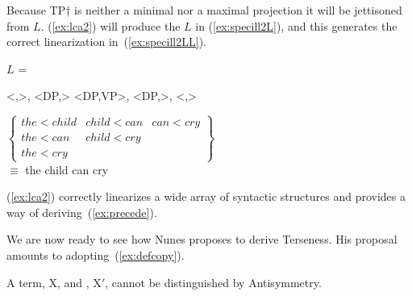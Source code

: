 \documentclass[output=paper]{langsci/langscibook}
\begin{document}
Because TP$\dag$ is neither a minimal nor a maximal projection it will be
jettisoned from $L$. (\ref{ex:lca2}) will produce the $L$ in
(\ref{ex:specill2L}), and this generates the correct linearization
in~(\ref{ex:specill2LL}).
\begin{exe}
	\ex \label{ex:sill2}
	\begin{xlist}
		\ex \label{ex:specill2L}
		$L$ = \parbox[t]{4in}{<,>, <DP,> <DP,VP>, <DP,>, <,>}
				\medskip
				\ex \label{ex:specill2LL}
				$\left\{
					\begin{array}{lll}
						the < child	&	child < can & can < cry\\
						the < can		&	child < cry\\
						the < cry		&
					\end{array}
				\right\}$\\[5pt]
				$\equiv$ the child can cry
	\end{xlist}
\end{exe}

(\ref{ex:lca2}) correctly linearizes a wide array of syntactic structures and
provides a way of deriving~(\ref{ex:precede}).

We are now ready to see how Nunes proposes to derive Terseness. His proposal
amounts to adopting~(\ref{ex:defcopy}).
\begin{exe}
	\ex \label{ex:defcopy}
	A term, X, and , X$'$, cannot be distinguished by Antisymmetry.
\end{exe}
\end{document}
